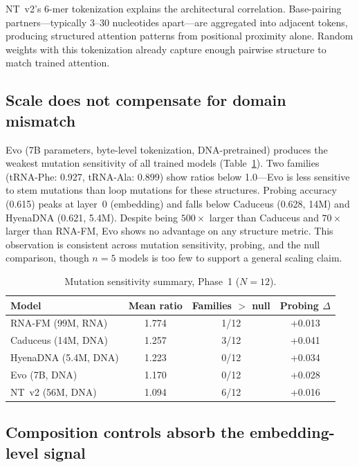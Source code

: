 \documentclass[11pt]{article}
\begin{document}
NT~v2's 6-mer tokenization explains the architectural correlation.
Base-pairing partners---typically 3--30 nucleotides apart---are
aggregated into adjacent tokens, producing structured attention
patterns from positional proximity alone.  Random weights with this
tokenization already capture enough pairwise structure to match
trained attention.

\subsection{Scale does not compensate for domain mismatch}
\label{sec:scale}

Evo (7B parameters, byte-level tokenization, DNA-pretrained) produces
the weakest mutation sensitivity of all trained models
(Table~\ref{tab:phase1_summary}).  Two families (tRNA-Phe: 0.927,
tRNA-Ala: 0.899) show ratios below 1.0---Evo is less sensitive to stem
mutations than loop mutations for these structures.  Probing accuracy
(0.615) peaks at layer~0 (embedding) and falls below Caduceus (0.628,
14M) and HyenaDNA (0.621, 5.4M).  Despite being $500\times$ larger
than Caduceus and $70\times$ larger than RNA-FM, Evo shows no
advantage on any structure metric.  This observation is consistent
across mutation sensitivity, probing, and the null comparison, though
$n = 5$ models is too few to support a general scaling claim.

\begin{table}[t]
\centering
\caption{Mutation sensitivity summary, Phase~1 ($N = 12$).}
\label{tab:phase1_summary}
\begin{tabular}{@{}lccc@{}}
\toprule
\textbf{Model} & \textbf{Mean ratio} &
  \textbf{Families $>$ null} & \textbf{Probing $\Delta$} \\
\midrule
RNA-FM (99M, RNA)    & 1.774 & 1/12 & +0.013 \\
Caduceus (14M, DNA)  & 1.257 & 3/12 & +0.041 \\
HyenaDNA (5.4M, DNA) & 1.223 & 0/12 & +0.034 \\
Evo (7B, DNA)        & 1.170 & 0/12 & +0.028 \\
NT~v2 (56M, DNA)     & 1.094 & 6/12 & +0.016 \\
\bottomrule
\end{tabular}
\end{table}

\subsection{Composition controls absorb the embedding-level signal}
\label{sec:composition}
\end{document}
